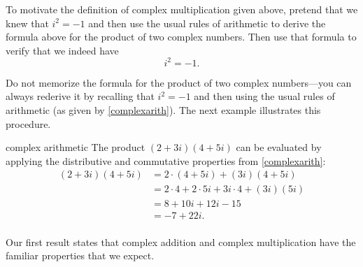 
To motivate the definition of complex multiplication given above, pretend that we knew that $i^2 = -1$ and then use the usual rules of arithmetic to derive the formula above for the product of two complex numbers. Then use that formula to verify that we indeed have
\[
i^2 = -1.
\]

Do not memorize the formula for the product of two complex numbers---you can always rederive it by recalling that
$i^2 = -1$  and then using the usual rules of arithmetic (as given by \ref{complexarith}). The next example illustrates this procedure.

\begin{example}{complex arithmetic}
The product $(2 + 3i)(4+5i)$ can be evaluated by applying the distributive and commutative properties from \ref{complexarith}:
\begin{align*}
(2 + 3i)(4+5i) &= 2 \cdot (4+5i) +(3i)(4+5i) \\
&= 2 \cdot 4 + 2 \cdot 5i + 3i\cdot 4 + (3i)(5i) \\
&= 8 + 10i + 12i -15 \\
&= -7 + 22i.\\[-24bp]
\end{align*}
\end{example}

Our first result states that complex addition and complex multiplication have the familiar properties that we expect.


